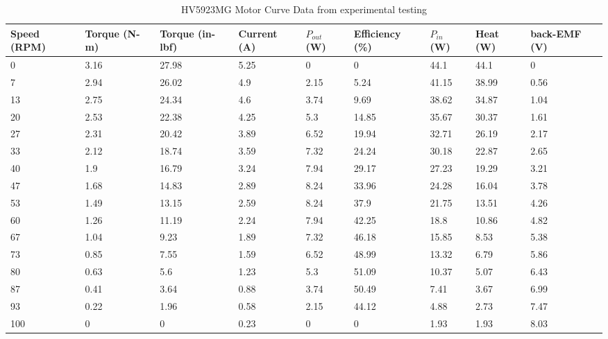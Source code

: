 \begin{table} [H]
	\centering
	\caption{HV5923MG Motor Curve Data from experimental testing}
	\label{tab:MotorData}
	\begin{tabular}{|p{1cm}|p{1.2cm}|p{1.4cm}|p{1cm}|p{1cm}|p{1.5cm}|p{1cm}|p{1cm}|p{1.1cm}|}
		\hline
		Speed (RPM) & Torque (N-m) & Torque (in-lbf) & Current (A) & $P_{out}$ (W) & Efficiency (\%) & $P_{in}$ (W) & Heat (W) & back-EMF (V) \\
		\hline
		
		0 & 3.16 & 27.98 & 5.25 & 0 & 0 & 44.1 & 44.1 & 0 \\
		
		7 & 2.94 & 26.02 & 4.9 & 2.15 & 5.24 & 41.15 & 38.99 & 0.56 \\
		
		13 & 2.75 & 24.34 & 4.6 & 3.74 & 9.69 & 38.62 & 34.87 & 1.04 \\
		
		20 & 2.53 & 22.38 & 4.25 & 5.3 & 14.85 & 35.67 & 30.37 & 1.61 \\
		
		27 & 2.31 & 20.42 & 3.89 & 6.52 & 19.94 & 32.71 & 26.19 & 2.17 \\
		
		33 & 2.12 & 18.74 & 3.59 & 7.32 & 24.24 & 30.18 & 22.87 & 2.65 \\
		
		40 & 1.9 & 16.79 & 3.24 & 7.94 & 29.17 & 27.23 & 19.29 & 3.21 \\
		
		47 & 1.68 & 14.83 & 2.89 & 8.24 & 33.96 & 24.28 & 16.04 & 3.78 \\
		
		53 & 1.49 & 13.15 & 2.59 & 8.24 & 37.9 & 21.75 & 13.51 & 4.26 \\
		
		60 & 1.26 & 11.19 & 2.24 & 7.94 & 42.25 & 18.8 & 10.86 & 4.82 \\
		
		67 & 1.04 & 9.23 & 1.89 & 7.32 & 46.18 & 15.85 & 8.53 & 5.38 \\
		
		73 & 0.85 & 7.55 & 1.59 & 6.52 & 48.99 & 13.32 & 6.79 & 5.86 \\
		
		80 & 0.63 & 5.6 & 1.23 & 5.3 & 51.09 & 10.37 & 5.07 & 6.43 \\
		
		87 & 0.41 & 3.64 & 0.88 & 3.74 & 50.49 & 7.41 & 3.67 & 6.99 \\
		
		93 & 0.22 & 1.96 & 0.58 & 2.15 & 44.12 & 4.88 & 2.73 & 7.47 \\
		
		100 & 0 & 0 & 0.23 & 0 & 0 & 1.93 & 1.93 & 8.03 \\
		\hline
		
	\end{tabular}
	
\end{table}

